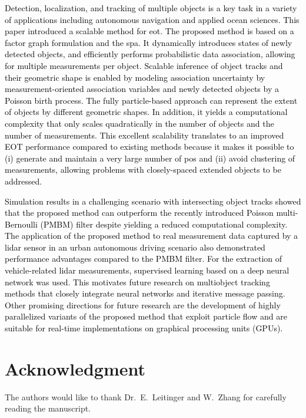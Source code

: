 \documentclass[10pt, twoside, romanappendices]{IEEEtran}
\providecommand{\rd}{\textcolor{black}}
\begin{document}
\rd{Detection, localization, and tracking of multiple objects is a key task in a variety of applications including autonomous navigation and applied ocean sciences. This paper introduced a scalable method for \ac{eot}. The proposed method is based on a factor graph formulation and the \ac{spa}. It dynamically introduces states of newly detected objects, and efficiently performs probabilistic data association, allowing for multiple measurements per object.  Scalable inference of object tracks and their geometric shape is enabled by modeling association uncertainty by measurement-oriented association variables and newly detected objects by a Poisson birth process. The fully particle-based approach can represent the extent of objects by different geometric shapes. In addition, it yields a computational complexity that only scales quadratically in the number of objects and the number of measurements. This excellent scalability translates to an improved EOT performance compared to existing methods because it makes it possible to (i)  generate and maintain a very large number of \acp{po} and (ii) avoid clustering of measurements, allowing problems with closely-spaced extended objects to be addressed.}

\rd{Simulation results in a challenging scenario with intersecting object tracks showed that the proposed method can outperform the recently introduced Poisson multi-Bernoulli (PMBM) filter despite yielding a reduced computational complexity. The application of the proposed method to real measurement data captured by a lidar sensor in an urban autonomous driving scenario also demonstrated performance advantages compared to the PMBM filter. For the extraction of vehicle-related lidar measurements, supervised learning based on a deep neural network was used. This motivates future research on multiobject tracking methods that closely integrate neural networks and iterative message passing. Other promising directions for future research are the development of highly parallelized variants of the proposed method that exploit particle flow \cite{LiCoates:17} and are suitable for real-time implementations on graphical processing units \vspace{0mm} (GPUs).}

\section*{Acknowledgment}
The authors would like to thank Dr.~E.~Leitinger and W.~Zhang for carefully reading the manuscript.
\end{document}
